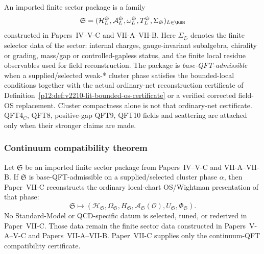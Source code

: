 \documentclass[12pt,a4paper]{article}
\begin{document}
\begin{definition}
An imported finite sector package is a family
\[
\mathfrak S=
(\mathcal H_L^{\mathfrak S},
 \mathcal A_L^{\mathfrak S},
 \omega_L^{\mathfrak S},
 T_L^{\mathfrak S},
 \Sigma_{\mathfrak S})_{L\in\RBH}
\]
constructed in Papers~IV--V-C and VII-A--VII-B.  Here \(\Sigma_{\mathfrak S}\) denotes the finite selector data of the sector: internal charges, gauge-invariant subalgebra, chirality or grading, mass/gap or controlled-gapless status, and the finite local residue observables used for field reconstruction.  The package is \emph{base-QFT-admissible} when a supplied/selected weak-*
cluster phase satisfies the bounded-local conditions together with the actual
ordinary-net reconstruction certificate of
Definition~\ref{p12:def:v2210-lit-bounded-os-certificate} or a verified
corrected field-OS replacement. Cluster compactness alone is not that
ordinary-net certificate.  QFT4$_C$, QFT8, positive-gap QFT9, QFT10 fields and scattering are attached only when their stronger claims are made.
\end{definition}


\subsubsection{Continuum compatibility theorem}
\label{p12:sec:sector-compatibility-theorem}

\begin{theorem}
\label{p12:thm:sector-import-qft-compatibility}
Let \(\mathfrak S\) be an imported finite sector package from Papers~IV--V-C and VII-A--VII-B.  If \(\mathfrak S\) is base-QFT-admissible on a supplied/selected cluster phase \(\alpha\), then Paper~VII-C reconstructs the ordinary local-chart OS/Wightman presentation of that phase:
\[
\mathfrak S
\longmapsto
(\mathcal H_{\mathfrak S},
 \Omega_{\mathfrak S},
 H_{\mathfrak S},
 \mathcal A_{\mathfrak S}(\mathcal O),
 U_{\mathfrak S},
 \Phi_{\mathfrak S}).
\]
No Standard-Model or QCD-specific datum is selected, tuned, or rederived in Paper~VII-C.  Those data remain the finite sector data constructed in Papers~V-A--V-C and Papers~VII-A--VII-B.  Paper~VII-C supplies only the continuum-QFT compatibility certificate.
\end{theorem}
\end{document}
